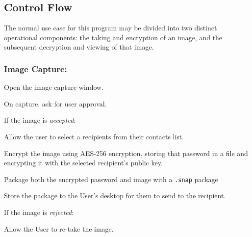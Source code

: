 \documentclass[11pt, a4paper,titlepage]{report}
\begin{document}
\subsection*{Control Flow}
The normal use case for this program may be divided into two distinct operational components: the taking and encryption of an image, and the subsequent decryption and viewing of that image.

\subsubsection{Image Capture:}
\begin{itemize*}
	\item Open the image capture window.
	\item On capture, ask for user approval.
	\begin{itemize*}
		\item[] If the image is \emph{accepted}:
		\begin{itemize*}
			\item Allow the user to select a recipients from their contacts list.
			\item Encrypt the image using AES-256 encryption, storing that password in a file and encrypting it with the selected recipient's public key.
			\item Package both the encrypted password and image with a \texttt{.snap} package
			\item Store the package to the User's desktop for them to send to the recipient.
		\end{itemize*}
		\item[] If the image is \emph{rejected}:
		\begin{itemize*}
			\item Allow the User to re-take the image.
		\end{itemize*}
	\end{itemize*}
\end{itemize*}
\end{document}

